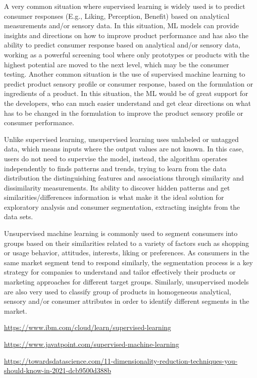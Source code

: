 \documentclass[
]{book}
\begin{document}
A very common situation where supervised learning is widely used is to predict consumer responses (E.g., Liking, Perception, Benefit) based on analytical measurements and/or sensory data. In this situation, ML models can provide insights and directions on how to improve product performance and has also the ability to predict consumer response based on analytical and/or sensory data, working as a powerful screening tool where only prototypes or products with the highest potential are moved to the next level, which may be the consumer testing. Another common situation is the use of supervised machine learning to predict product sensory profile or consumer response, based on the formulation or ingredients of a product. In this situation, the ML would be of great support for the developers, who can much easier understand and get clear directions on what has to be changed in the formulation to improve the product sensory profile or consumer performance.

Unlike supervised learning, unsupervised learning uses unlabeled or untagged data, which means inputs where the output values are not known. In this case, users do not need to supervise the model, instead, the algorithm operates independently to finds patterns and trends, trying to learn from the data distribution the distinguishing features and associations through similarity and dissimilarity measurements. Its ability to discover hidden patterns and get similarities/differences information is what make it the ideal solution for exploratory analysis and consumer segmentation, extracting insights from the data sets.

Unsupervised machine learning is commonly used to segment consumers into groups based on their similarities related to a variety of factors such as shopping or usage behavior, attitudes, interests, liking or preferences. As consumers in the same market segment tend to respond similarly, the segmentation process is a key strategy for companies to understand and tailor effectively their products or marketing approaches for different target groups. Similarly, unsupervised models are also very used to classify group of products in homogeneous analytical, sensory and/or consumer attributes in order to identify different segments in the market.

\url{https://www.ibm.com/cloud/learn/supervised-learning}

\url{https://www.javatpoint.com/supervised-machine-learning}

\url{https://towardsdatascience.com/11-dimensionality-reduction-techniques-you-should-know-in-2021-dcb9500d388b}
\end{document}
